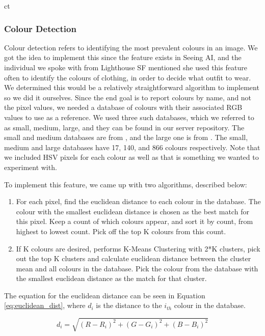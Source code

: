 ct\documentclass[a4paper,11pt]{article}
\begin{document}
\subsubsection{Colour Detection}
\label{colour-detection}
Colour detection refers to identifying the most prevalent colours in an image. We got the idea to implement this since the feature exists in Seeing AI, and the individual we spoke with from Lighthouse SF mentioned she used this feature often to identify the colours of clothing, in order to decide what outfit to wear. We determined this would be a relatively straightforward algorithm to implement so we did it ourselves. Since the end goal is to report colours by name, and not the pixel values, we needed a database of colours with their associated RGB values to use as a reference. We used three such databases, which we referred to as small, medium, large, and they can be found
\href{https://github.com/vizia-fydp/server/tree/main/color_detection}{\color{blue}{here}}
 in our server repository. The small and medium databases are from \cite{color-small-medium}, and the large one is from \cite{color-large}. The small, medium and large databases have 17, 140, and 866 colours respectively. Note that we included HSV pixels for each colour as well as that is something we wanted to experiment with.

To implement this feature, we came up with two algorithms, described below:

\newpage
\begin{enumerate}
    \item For each pixel, find the euclidean distance to each colour in the database. The colour with the smallest euclidean distance is chosen as the best match for this pixel. Keep a count of which colours appear, and sort it by count, from highest to lowest count. Pick off the top K colours from this count.
    \item If K colours are desired, performs K-Means Clustering \cite{k-means-wikipedia, k-means-opencv} with 2*K clusters, pick out the top K clusters and calculate euclidean distance between the cluster mean and all colours in the database. Pick the colour from the database with the smallest euclidean distance as the match for that cluster.
\end{enumerate}

The equation for the euclidean distance can be seen in Equation \ref{eq:euclidean_dist}, where $d_i$ is the distance to the $i_{th}$ colour in the database. 

\begin{equation}
\label{eq:euclidean_dist}
d_i=\sqrt{(R - R_i)^2 + (G - G_i)^2 + (B - B_i)^2}
\end{equation}
\end{document}
